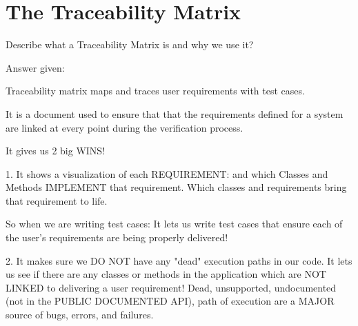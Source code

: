 \section{The Traceability Matrix}

Describe what a Traceability Matrix is and why we use it?
 
Answer given:
 
Traceability matrix maps and traces user requirements with test cases. 

It is a document used to ensure that that the requirements defined for a system are linked at every point during the verification process.

It gives us 2 big WINS!

1. It shows a visualization of each REQUIREMENT: and which Classes and Methods IMPLEMENT that requirement. Which classes and requirements bring that requirement to life. 

So when we are writing test cases:
It lets us write test cases that ensure each of the user's requirements are being properly delivered!

2. It makes sure we DO NOT have any "dead" execution paths in our code. It lets us see if there are any classes or methods in the application which are NOT LINKED to delivering a user requirement!
Dead, unsupported, undocumented (not in the PUBLIC DOCUMENTED API), path of execution are a MAJOR source of bugs, errors, and failures.